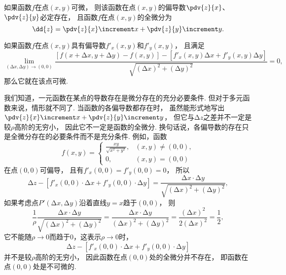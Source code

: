 \begin{theorem}[必要条件2]\label{theorem:多元函数微分法.二元函数可微的必要条件}
如果函数\(f\)在点\((x,y)\)可微，
则该函数在点\((x,y)\)的偏导数\(\pdv{z}{x}\)、\(\pdv{z}{y}\)必定存在，
且函数\(f\)在点\((x,y)\)的全微分为\begin{equation*}
	\dd{z} = \pdv{z}{x} \increment x + \pdv{z}{y} \increment y.
\end{equation*}
\end{theorem}

\begin{theorem}\label{theorem:多元函数微分法.二元函数可微的充分必要条件}
如果函数\(f\)在点\((x,y)\)具有偏导数\(f'_x(x,y)\)和\(f'_y(x,y)\)，
且满足\begin{equation*}
	\lim_{(\increment x,\increment y)\to(0,0)}
	\frac{
		[f(x+\increment x,y+\increment y)-f(x,y)]
		-[f'_x(x,y) \increment x + f'_y(x,y) \increment y]
	}{
		\sqrt{(\increment x)^2+(\increment y)^2}
	} = 0,
\end{equation*}那么它就在该点可微.
\end{theorem}

我们知道，一元函数在某点的导数存在是微分存在的充分必要条件.
但对于多元函数来说，情形就不同了.
当函数的各偏导数都存在时，
虽然能形式地写出\(\pdv{z}{x} \increment x + \pdv{z}{y} \increment y\)，
但它与\(\increment z\)之差并不一定是较\(\rho\)高阶的无穷小，
因此它不一定是函数的全微分.
换句话说，各偏导数的存在只是全微分存在的必要条件而不是充分条件.
例如，函数\begin{equation*}
	f(x,y) = \left\{ \begin{array}{cl}
		\frac{xy}{\sqrt{x^2+y^2}}, & (x,y)\neq(0,0), \\
		0, & (x,y)=(0,0)
	\end{array} \right.
\end{equation*}在点\((0,0)\)可偏导，
且有\(f'_x(0,0) = f'_y(0,0) = 0\)，
所以\begin{equation*}
	\increment z - [f'_x(0,0) \cdot \increment x + f'_y(0,0) \cdot \increment y]
	= \frac{\increment x \cdot \increment y}{\sqrt{(\increment x)^2+(\increment y)^2}},
\end{equation*}
如果考虑点\(P'(\increment x,\increment y)\)沿着直线\(y=x\)趋于\((0,0)\)，
则\begin{equation*}
	\frac{1}{\rho} \frac{\increment x \cdot \increment y}{\sqrt{(\increment x)^2+(\increment y)^2}}
	= \frac{\increment x \cdot \increment y}{(\increment x)^2+(\increment y)^2}
	= \frac{(\increment x)^2}{2(\increment x)^2}
	= \frac{1}{2},
\end{equation*}
它不能随\(\rho\to0\)而趋于\(0\)，这表示\(\rho\to0\)时，\begin{equation*}
	\increment z - [f'_x(0,0) \cdot \increment x + f'_y(0,0) \cdot \increment y]
\end{equation*}并不是较\(\rho\)高阶的无穷小，
因此函数在点\((0,0)\)处的全微分并不存在，
即函数在点\((0,0)\)处是不可微的.

